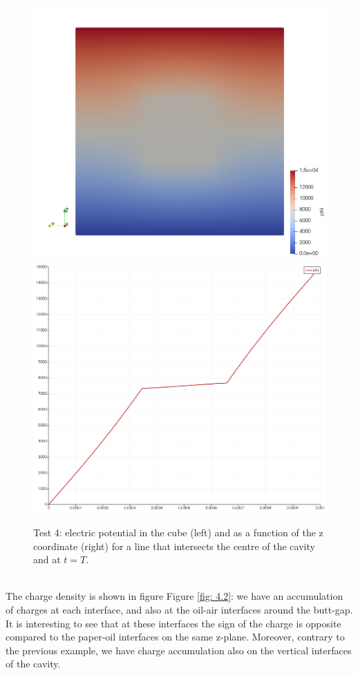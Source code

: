 \documentclass{Configuration_Files/PoliMi3i_thesis}
\begin{document}
\begin{figure}[h!]
    \centering
   \includegraphics[scale=0.2]{Images/4.phi_3d.jpeg}
   \includegraphics[scale=0.2]{Images/4.phi.jpeg}
    \caption {Test 4: electric potential in the cube (left) and as a function of the z coordinate (right) for a line that intersects the centre of the cavity and at $t=T$.}
    \label{fig: 4.1.5}
\end{figure}
\\The charge density is shown in figure Figure \ref{fig: 4.2}: we have an accumulation of charges at each interface, and also at the oil-air interfaces around the butt-gap. It is interesting to see that at these interfaces the sign of the charge is opposite compared to the paper-oil interfaces on the same z-plane. Moreover, contrary to the previous example, we have charge accumulation also on the vertical interfaces of the cavity.
\end{document}
